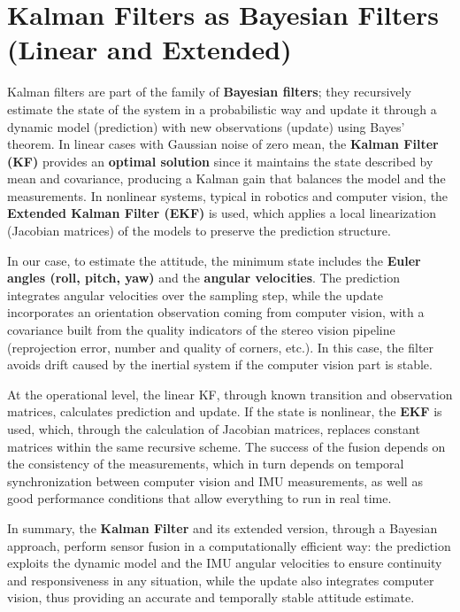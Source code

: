 \section[Kalman Filters as Bayesian Filters]{Kalman Filters as Bayesian Filters (Linear and Extended)}

Kalman filters are part of the family of \textbf{Bayesian filters}; they recursively estimate the state of the system in a probabilistic way and update it through a dynamic model (prediction) with new observations (update) using Bayes’ theorem. In linear cases with Gaussian noise of zero mean, the \textbf{Kalman Filter (KF)} provides an \textbf{optimal solution} since it maintains the state described by mean and covariance, producing a Kalman gain that balances the model and the measurements. In nonlinear systems, typical in robotics and computer vision, the \textbf{Extended Kalman Filter (EKF)} is used, which applies a local linearization (Jacobian matrices) of the models to preserve the prediction structure.

In our case, to estimate the attitude, the minimum state includes the \textbf{Euler angles (roll, pitch, yaw)} and the \textbf{angular velocities}. The prediction integrates angular velocities over the sampling step, while the update incorporates an orientation observation coming from computer vision, with a covariance built from the quality indicators of the stereo vision pipeline (reprojection error, number and quality of corners, etc.). In this case, the filter avoids drift caused by the inertial system if the computer vision part is stable.

At the operational level, the linear KF, through known transition and observation matrices, calculates prediction and update. If the state is nonlinear, the \textbf{EKF} is used, which, through the calculation of Jacobian matrices, replaces constant matrices within the same recursive scheme. The success of the fusion depends on the consistency of the measurements, which in turn depends on temporal synchronization between computer vision and IMU measurements, as well as good performance conditions that allow everything to run in real time.

In summary, the \textbf{Kalman Filter} and its extended version, through a Bayesian approach, perform sensor fusion in a computationally efficient way: the prediction exploits the dynamic model and the IMU angular velocities to ensure continuity and responsiveness in any situation, while the update also integrates computer vision, thus providing an accurate and temporally stable attitude estimate.
